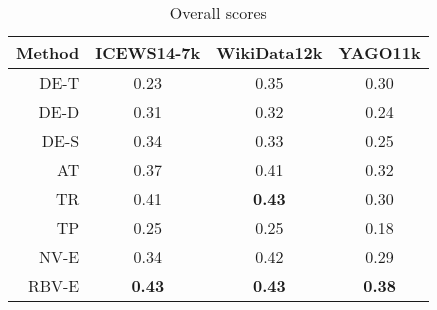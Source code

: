 \begin{table}[htb]
\centering
\begin{minipage}{\columnwidthcaption}
\centering
\caption{Overall scores}
\vspace{-3mm}

\begin{tabular}{r|SSS} \hline
Method & {\mbox{ICEWS14-7k}} & {WikiData12k} & {YAGO11k} \\ \hline
DE-T & 0.23 & 0.35 & 0.30 \\
DE-D & 0.31 & 0.32 & 0.24 \\
DE-S & 0.34 & 0.33 & 0.25 \\
AT & 0.37 & 0.41 & 0.32 \\
TR & 0.41 & \textbf{0.43} & 0.30 \\
TP & 0.25 & 0.25 & 0.18 \\
NV-E & 0.34 & 0.42 & 0.29 \\
RBV-E & \textbf{0.43} & \textbf{0.43} & \textbf{0.38} \\
\hline
\end{tabular}

\label{tab:overall_scores}
\end{minipage}
\end{table}

